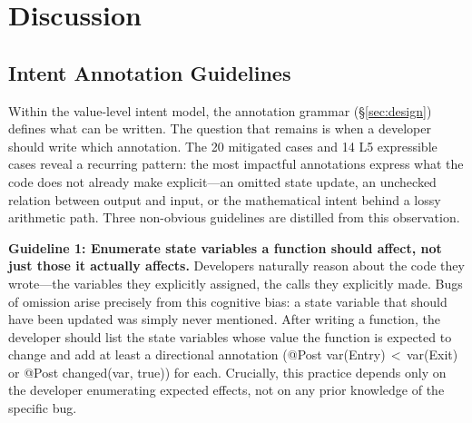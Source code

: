 \documentclass[pdflatex,sn-basic]{sn-jnl}%
\theoremstyle{thmstyleone}%
\theoremstyle{thmstyletwo}%
\theoremstyle{thmstylethree}%
\begin{document}
%

\section{Discussion}\label{sec:discussion}

\subsection{Intent Annotation Guidelines}\label{sec:disc:guidelines}

Within the value-level intent model, the annotation grammar (\S\ref{sec:design}) defines what can be written. The question that remains is when a developer should write which annotation.
The 20 mitigated cases and 14 L5 expressible cases reveal a recurring pattern: the most impactful annotations express what the code does not already make explicit---an omitted state update, an unchecked relation between output and input, or the mathematical intent behind a lossy arithmetic path.
Three non-obvious guidelines are distilled from this observation.

\smallskip
\noindent\textbf{Guideline 1: Enumerate state variables a function should affect, not just those it actually affects.}
Developers naturally reason about the code they wrote---the variables they explicitly assigned, the calls they explicitly made.
Bugs of omission arise precisely from this cognitive bias: a state variable that should have been updated was simply never mentioned.
After writing a function, the developer should list the state variables whose value the function is expected to change and add at least a directional annotation (@Post var(Entry)\,$<$\,var(Exit) or @Post changed(var, true)) for each.
Crucially, this practice depends only on the developer enumerating expected effects, not on any prior knowledge of the specific bug.
\end{document}
